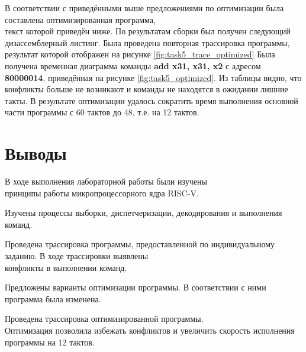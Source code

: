 \documentclass[a4paper, 14pt]{article}
\begin{document}
    В соответствии с приведёнными выше предложениями по оптимизации была составлена оптимизированная программа,\\ текст которой приведён ниже.
    По результатам сборки был получен следующий дизассемблерный листинг.
    Была проведена повторная трассировка программы, результат которой отображен на рисунке \ref{fig:task5_trace_optimized}
    Была получена временная диаграмма команды \textbf{add x31, x31, x2} с адресом \textbf{80000014}, приведённая на рисунке \ref{fig:task5_optimized}.
    Из таблицы видно, что конфликты больше не возникают и команды не находятся в ожидании лишние такты.
    В результате оптимизации удалось сократить время выполнения основной части программы с 60 тактов до 48, т.е. на 12 тактов.
    \pagebreak
    \section*{Выводы}
    В ходе выполнения лабораторной работы были изучены \\ принципы работы микропроцессорного ядра RISC-V.
    
    Изучены процессы выборки, диспетчеризации, декодирования и выполнения команд.

    Проведена трассировка программы, предоставленной по индивидуальному заданию. В ходе трассировки выявлены \\конфликты в выполнении команд.

    Предложены варианты оптимизации программы. В соответствии с ними программа была изменена.

    Проведена трассировка оптимизированной программы. \\Оптимизация позволила избежать конфликтов и увеличить скорость исполнения программы на 12 тактов.
\end{document}

